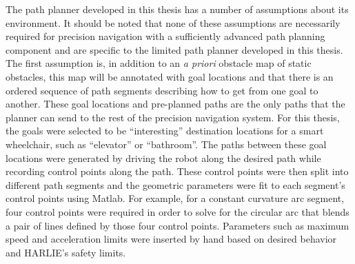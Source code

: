 The path planner developed in this thesis has a number of assumptions about its environment. It should be noted that none of these assumptions are necessarily required for precision navigation with a sufficiently advanced path planning component and are specific to the limited path planner developed in this thesis. The first assumption is, in addition to an \emph{a priori} obstacle map of static obstacles, this map will be annotated with goal locations and that there is an ordered sequence of path segments describing how to get from one goal to another. These goal locations and pre-planned paths are the only paths that the planner can send to the rest of the precision navigation system. For this thesis, the goals were selected to be ``interesting'' destination locations for a smart wheelchair, such as ``elevator'' or ``bathroom''. The paths between these goal locations were generated by driving the robot along the desired path while recording control points along the path. These control points were then split into different path segments and the geometric parameters were fit to each segment's control points using Matlab. For example, for a constant curvature arc segment, four control points were required in order to solve for the circular arc that blends a pair of lines defined by those four control points. Parameters such as maximum speed and acceleration limits were inserted by hand based on desired behavior and HARLIE's safety limits.

